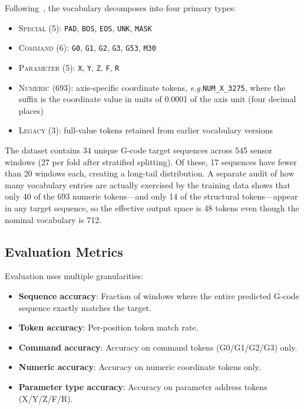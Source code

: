 \documentclass[sensors,article,submit,moreauthors,pdftex]{Definitions/mdpi}
\newcommand{\eg}{\textit{e.g.}}
\begin{document}
Following~\cite{grammar_paper}, the vocabulary decomposes into four primary types:
\begin{itemize}[leftmargin=*]
    \item \textsc{Special} (5): \texttt{PAD}, \texttt{BOS}, \texttt{EOS}, \texttt{UNK}, \texttt{MASK}
    \item \textsc{Command} (6): \texttt{G0}, \texttt{G1}, \texttt{G2}, \texttt{G3}, \texttt{G53}, \texttt{M30}
    \item \textsc{Parameter} (5): \texttt{X}, \texttt{Y}, \texttt{Z}, \texttt{F}, \texttt{R}
    \item \textsc{Numeric} (693): axis-specific coordinate tokens, \eg \texttt{NUM\_X\_3275}, where the suffix is the coordinate value in units of 0.0001 of the axis unit (four decimal places)
    \item \textsc{Legacy} (3): full-value tokens retained from earlier vocabulary versions
\end{itemize}

The dataset contains 34 unique G-code target sequences across 545 sensor windows (27 per fold after stratified splitting). Of these, 17 sequences have fewer than 20 windows each, creating a long-tail distribution. A separate audit of how many vocabulary entries are actually exercised by the training data shows that only 40 of the 693 numeric tokens---and only 14 of the structural tokens---appear in any target sequence, so the effective output space is 48 tokens even though the nominal vocabulary is 712.

\subsection{Evaluation Metrics}

Evaluation uses multiple granularities:
\begin{itemize}[leftmargin=*]
    \item \textbf{Sequence accuracy}: Fraction of windows where the entire predicted G-code sequence exactly matches the target.
    \item \textbf{Token accuracy}: Per-position token match rate.
    \item \textbf{Command accuracy}: Accuracy on command tokens (G0/G1/G2/G3) only.
    \item \textbf{Numeric accuracy}: Accuracy on numeric coordinate tokens only.
    \item \textbf{Parameter type accuracy}: Accuracy on parameter address tokens (X/Y/Z/F/R).
\end{itemize}
\end{document}
